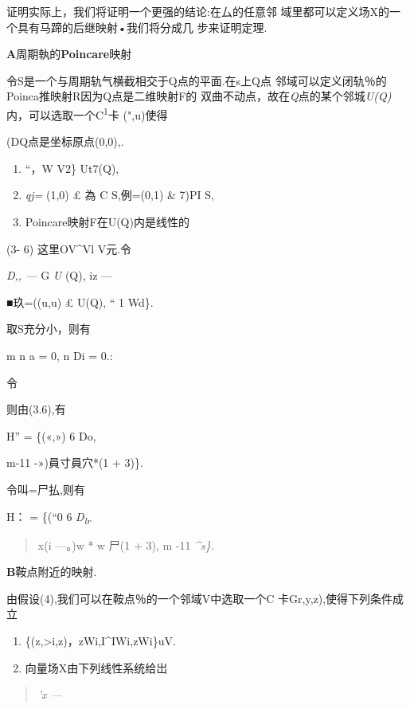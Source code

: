 \documentclass{article}
\begin{document}
证明实际上，我们将证明一个更强的结论:在厶的任意邻
域里都可以定义场X的一个具有马蹄的后继映射•我们将分成几 步来证明定理.

\textbf{A}周期執的\textbf{Poincare}映射

令S是一个与周期轨气横截相交于Q点的平面.在s上Q点
邻域可以定义闭轨％的Poinca推映射R因为Q点是二维映射F的
双曲不动点，故在\emph{Q}点的某个邻城\emph{U(Q)}内，可以选取一个C\textsuperscript{1}卡
(",u)使得

(DQ点是坐标原点(0,0),.

\begin{enumerate}
\def\labelenumi{(\arabic{enumi})}
\setcounter{enumi}{1}
\item
  \textbar{}``\textbar{}，W\textbar{} V2\} Ut7(Q),
\item
  \emph{qj=} (1,0) £ 為 C\textbar{} S,例=(0,1) \& 7)PI S,
\item
  Poincare映射F在U(Q)内是线性的
\end{enumerate}

(3- 6) 这里OV\^{}Vl V元.令

\emph{D,, ---} G \emph{U} (Q), \textbar{}iz ---

■玖=((u,u) £ U(Q), \textbar{}``\textbar{} 1\textbar{} Wd\}.

取S充分小，则有

m n a = 0, n Di = 0.:

令

则由(3.6),有

H'' = \{(«,») 6 Do,

m-11 -»)員寸員穴*(1 + 3)\}.

令叫=尸払,则有

H： = \{(``0 6 \emph{D\textsubscript{lr}}

\begin{quote}
x(i ---。)w * w 尸(1 + 3), m -11 \emph{\^{}s\}.}
\end{quote}

\textbf{B}鞍点附近的映射.

由假设(4),我们可以在鞍点％的一个邻域V中选取一个C
卡Gr,y,z),使得下列条件成立

\begin{enumerate}
\def\labelenumi{(\arabic{enumi})}
\item
  \{(z,\textgreater{}i,z)，\textbar{}z\textbar{}Wi,I\^{}IWi,\textbar{}z\textbar{}Wi\}uV.
\item
  向量场X由下列线性系统给岀
\end{enumerate}

\begin{quote}
\emph{'x ---}
\end{quote}
\end{document}

